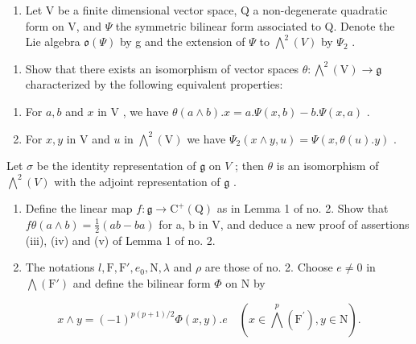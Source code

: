 \begin{enumerate}
\def\labelenumi{\arabic{enumi})}
\setcounter{enumi}{17}
\tightlist
\item
  Let V be a finite dimensional vector space, Q a non-degenerate quadratic form on V, and \(\Psi\) the symmetric bilinear form associated to Q. Denote the Lie algebra \(\mathfrak{o}(\varPsi)\) by g and the extension of \(\varPsi\) to \(\bigwedge^{2}(V)\) by \(\varPsi_{2}\) .
\end{enumerate}

\begin{enumerate}
\def\labelenumi{\alph{enumi})}
\tightlist
\item
  Show that there exists an isomorphism of vector spaces \(\theta : \bigwedge^{2}(\mathrm{V}) \to \mathfrak{g}\) characterized by the following equivalent properties:
\end{enumerate}

\begin{enumerate}
\def\labelenumi{(\roman{enumi})}
\item
  For \(a, b\) and \(x\) in \(\mathrm{V}\) , we have \(\theta(a \wedge b). x = a. \Psi(x, b) - b. \Psi(x, a)\) .
\item
  For \(x, y\) in V and \(u\) in \(\bigwedge^2 (\mathrm{V})\) we have \(\varPsi_2(x\wedge y,u) = \varPsi (x,\theta (u).y)\) .
\end{enumerate}

Let \(\sigma\) be the identity representation of \(\mathfrak{g}\) on \(V\) ; then \(\theta\) is an isomorphism of \(\bigwedge^{2}(V)\) with the adjoint representation of \(\mathfrak{g}\) .

\begin{enumerate}
\def\labelenumi{\alph{enumi})}
\setcounter{enumi}{1}
\item
  Define the linear map \(f: \mathfrak{g} \to \mathrm{C}^{+}(\mathrm{Q})\) as in Lemma 1 of no. 2. Show that \(f\theta(a \wedge b) = \frac{1}{2}(ab - ba)\) for a, b in V, and deduce a new proof of assertions (iii), (iv) and (v) of Lemma 1 of no. 2.
\item
  The notations \(l, \mathrm{F}, \mathrm{F}', e_0, \mathrm{N}, \lambda\) and \(\rho\) are those of no. 2. Choose \(e \neq 0\) in \(\bigwedge (\mathrm{F}')\) and define the bilinear form \(\varPhi\) on \(\mathrm{N}\) by
\end{enumerate}

\[
x \wedge y = (- 1) ^ {p (p + 1) / 2} \Phi (x, y). e \quad (x \in \bigwedge^ {p} (\mathrm{F} ^ {\prime}), y \in \mathrm{N}).
\]


